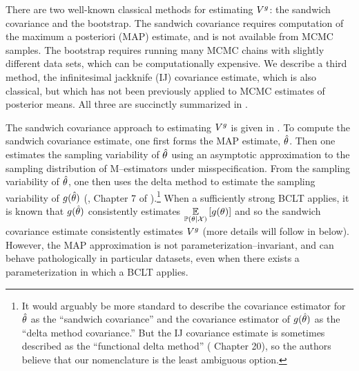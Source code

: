 



There are two well-known classical methods for estimating $V^g$: the
sandwich covariance and the bootstrap.  The sandwich covariance
requires computation of the maximum a posteriori (MAP) estimate, and is
not available from MCMC samples.  The bootstrap requires running many MCMC
chains with slightly different data sets, which can be computationally
expensive. We describe a third method, the infinitesimal jackknife (IJ)
covariance estimate, which is also classical, but which has not been previously
applied to MCMC estimates of posterior means.  All three
are succinctly summarized in .

The sandwich covariance approach to estimating $V^g$ is given in
. To compute the sandwich covariance estimate, one first forms
the MAP estimate, $\hat\theta$.  Then one estimates the sampling variability of
$\hat\theta$ using an asymptotic approximation to the sampling distribution of
M--estimators under misspecification.  From the sampling variability of
$\hat\theta$, one then uses the delta method to estimate the sampling variability
of $g(\hat\theta)$ (\citet{stefanski:2002:mestimation}, Chapter 7 of
\citet{van:2000:asymptotic}).\footnote{It would arguably be more standard to
describe the covariance estimator for $\hat\theta$ as the ``sandwich covariance''
and the covariance estimator of $g(\hat\theta)$ as the ``delta method covariance.''  But
the IJ covariance estimate is sometimes described as the ``functional delta method''
(\citet{van:2000:asymptotic} Chapter 20), so the authors believe that our
nomenclature is the least ambiguous option.}
%
When a sufficiently strong BCLT applies, it is known that
$g(\hat\theta)$ consistently estimates $\underset{\mathbb{P}(\theta | {\mathcal{X}})}{\mathbb{E}}\left[g(\theta)\right]$ and so the
sandwich covariance estimate consistently estimates $V^g$ 
(more details will follow in  below).  However, the MAP
approximation is not parameterization--invariant, and can behave pathologically
in particular datasets, even when there exists a parameterization in which a
BCLT applies.

